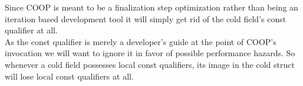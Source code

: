 Since COOP is meant to be a finalization step  optimization rather than being an iteration based development tool it will simply get rid of the cold field's const qualifier at all.\\
As the const qualifier is merely a developer's guide at the point of COOP's invocation we will want to ignore it in favor of possible performance hazards. So whenever a cold field possesses local const qualifiers, its image in the cold struct will lose local const qualifiers at all.
